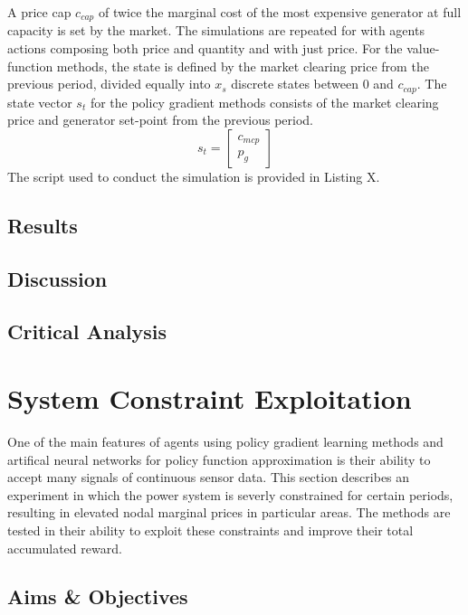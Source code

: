 A price cap $c_{cap}$ of twice the marginal cost of the most expensive generator
at full capacity is set by the market.  The simulations are repeated for with agents
actions composing both price and quantity and with just price.  For the
value-function methods, the state is defined by the market clearing price from
the previous period, divided equally into $x_s$ discrete states between $0$ and
$c_{cap}$.  The state vector $s_t$ for the policy gradient methods consists of
the market clearing price and generator set-point from the previous period.
\begin{equation}
s_t =
\begin{bmatrix}
c_{mcp}\\
p_g
\end{bmatrix}
\end{equation}
The script used to conduct the simulation is provided in Listing X.

\section{Results}
\section{Discussion}
\section{Critical Analysis}

\chapter{System Constraint Exploitation}
\label{ch:exploitation}
One of the main features of agents using policy gradient learning methods and
artifical neural networks for policy function approximation is their ability to
accept many signals of continuous sensor data.  This section describes an
experiment in which the power system is severly constrained for certain
periods, resulting in elevated nodal marginal prices in particular areas.  The
methods are tested in their ability to exploit these constraints and improve
their total accumulated reward.

\section{Aims \& Objectives}


